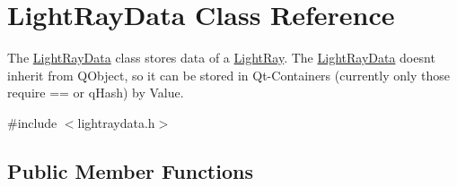 \hypertarget{class_light_ray_data}{}\section{Light\+Ray\+Data Class Reference}
\label{class_light_ray_data}


The \hyperlink{class_light_ray_data}{Light\+Ray\+Data} class stores data of a \hyperlink{class_light_ray}{Light\+Ray}. The \hyperlink{class_light_ray_data}{Light\+Ray\+Data} doesn\textquotesingle{}t inherit from Q\+Object, so it can be stored in Qt-\/\+Containers (currently only those require == or q\+Hash) by Value.  




{\ttfamily \#include $<$lightraydata.\+h$>$}

\subsection*{Public Member Functions}
